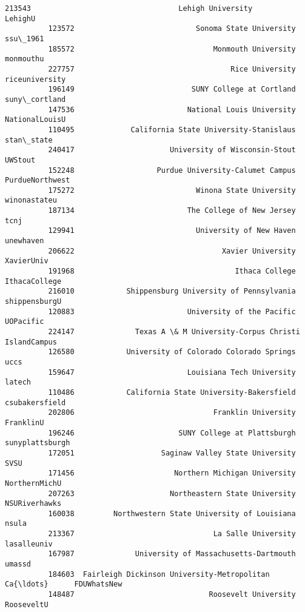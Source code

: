 \documentclass[11pt]{article}
\begin{document}
\begin{Verbatim}[commandchars=\\\{\}]
          213543                                  Lehigh University          LehighU   
          123572                            Sonoma State University         ssu\_1961   
          185572                                Monmouth University        monmouthu   
          227757                                    Rice University   riceuniversity   
          196149                           SUNY College at Cortland    suny\_cortland   
          147536                          National Louis University   NationalLouisU   
          110495             California State University-Stanislaus       stan\_state   
          240417                      University of Wisconsin-Stout          UWStout   
          152248                   Purdue University-Calumet Campus  PurdueNorthwest   
          175272                            Winona State University     winonastateu   
          187134                          The College of New Jersey             tcnj   
          129941                            University of New Haven        unewhaven   
          206622                                  Xavier University       XavierUniv   
          191968                                     Ithaca College    IthacaCollege   
          216010            Shippensburg University of Pennsylvania    shippensburgU   
          120883                          University of the Pacific        UOPacific   
          224147              Texas A \& M University-Corpus Christi     IslandCampus   
          126580            University of Colorado Colorado Springs             uccs   
          159647                          Louisiana Tech University           latech   
          110486            California State University-Bakersfield   csubakersfield   
          202806                                Franklin University        FranklinU   
          196246                        SUNY College at Plattsburgh  sunyplattsburgh   
          172051                    Saginaw Valley State University             SVSU   
          171456                       Northern Michigan University    NorthernMichU   
          207263                      Northeastern State University    NSURiverhawks   
          160038         Northwestern State University of Louisiana            nsula   
          213367                                La Salle University      lasalleuniv   
          167987              University of Massachusetts-Dartmouth           umassd   
          184603  Fairleigh Dickinson University-Metropolitan Ca{\ldots}      FDUWhatsNew   
          148487                               Roosevelt University       RooseveltU   

\end{Verbatim}
\end{document}
